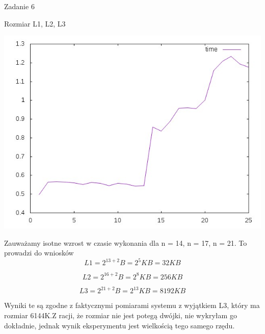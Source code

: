 \documentclass[11pt,wide]{mwart}
\begin{document}
\begin{section}{Zadanie 6}
\begin{subsection}{Rozmiar L1, L2, L3}
\begin{center}
\includegraphics[scale=0.75]{wykres6b.jpg}
\end{center}

Zauważamy isotne wzrost w czasie wykonania dla n = 14, n = 17, n = 21. To prowadzi do wniosków
\begin{equation*}
L1 = 2^{13 + 2} B = 2^5 KB = 32 KB
\end{equation*}

\begin{equation*}
L2 = 2^{16 + 2} B = 2^8 KB = 256 KB
\end{equation*}

\begin{equation*}
L3 = 2^{21 + 2} B = 2^{13} KB = 8192 KB
\end{equation*}

Wyniki te są zgodne z faktycznymi pomiarami systemu z wyjątkiem L3, który ma rozmiar 6144K.Z racji, że rozmiar nie jest potegą dwójki, nie wykryłam go dokładnie, jednak wynik eksperymentu jest wielkością tego samego rzędu.
\end{subsection}
\end{section}
\end{document}
